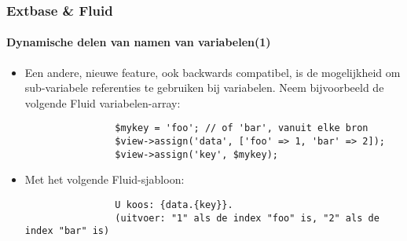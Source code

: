 
\begin{frame}[fragile]
	\frametitle{Extbase \& Fluid}
	\framesubtitle{Dynamische delen van namen van variabelen(1)}

	\lstset{basicstyle=\tiny\ttfamily}

	\begin{itemize}

		\item Een andere, nieuwe feature, ook backwards compatibel, is de mogelijkheid
			om sub-variabele referenties te gebruiken bij variabelen.
			Neem bijvoorbeeld de volgende Fluid variabelen-array:

			\begin{lstlisting}
				$mykey = 'foo'; // of 'bar', vanuit elke bron
				$view->assign('data', ['foo' => 1, 'bar' => 2]);
				$view->assign('key', $mykey);
			\end{lstlisting}

		\item Met het volgende Fluid-sjabloon:

			\begin{lstlisting}
				U koos: {data.{key}}.
				(uitvoer: "1" als de index "foo" is, "2" als de index "bar" is)
			\end{lstlisting}

	\end{itemize}

\end{frame}


